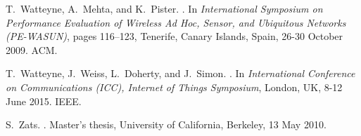 \documentclass{elsarticle}
\begin{document}
\begin{thebibliography}{10}
T.~Watteyne, A.~Mehta, and K.~Pister.
.
\newblock In {\em International Symposium on Performance Evaluation of Wireless
  Ad Hoc, Sensor, and Ubiquitous Networks (PE-WASUN)}, pages 116--123,
  Tenerife, Canary Islands, Spain, 26-30 October 2009. ACM.

T.~Watteyne, J.~Weiss, L.~Doherty, and J.~Simon.
.
\newblock In {\em International Conference on Communications (ICC), Internet of
  Things Symposium}, London, UK, 8-12 June 2015. IEEE.

S.~Zats.
.
\newblock Master's thesis, University of California, Berkeley, 13 May 2010.

\end{thebibliography}
\end{document}
